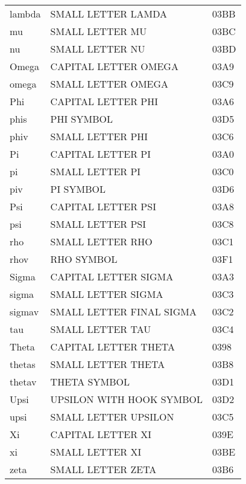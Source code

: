 \begin{longtable}{lll}
lambda             &  SMALL LETTER LAMDA            & 03BB\\
mu                 &  SMALL LETTER MU               & 03BC\\
nu                 &  SMALL LETTER NU               & 03BD\\
Omega              &  CAPITAL LETTER OMEGA          & 03A9\\
omega              &  SMALL LETTER OMEGA            & 03C9\\
Phi                &  CAPITAL LETTER PHI            & 03A6\\
phis               &  PHI SYMBOL                    & 03D5\\
phiv               &  SMALL LETTER PHI              & 03C6\\
Pi                 &  CAPITAL LETTER PI             & 03A0\\
pi                 &  SMALL LETTER PI               & 03C0\\
piv                &  PI SYMBOL                     & 03D6\\
Psi                &  CAPITAL LETTER PSI            & 03A8\\
psi                &  SMALL LETTER PSI              & 03C8\\
rho                &  SMALL LETTER RHO              & 03C1\\
rhov               &  RHO SYMBOL                    & 03F1\\
Sigma              &  CAPITAL LETTER SIGMA          & 03A3\\
sigma              &  SMALL LETTER SIGMA            & 03C3\\
sigmav             &  SMALL LETTER FINAL SIGMA      & 03C2\\
tau                &  SMALL LETTER TAU              & 03C4\\
Theta              &  CAPITAL LETTER THETA          & 0398\\
thetas             &  SMALL LETTER THETA            & 03B8\\
thetav             &  THETA SYMBOL                  & 03D1\\
Upsi               &  UPSILON WITH HOOK SYMBOL      & 03D2\\
upsi               &  SMALL LETTER UPSILON          & 03C5\\
Xi                 &  CAPITAL LETTER XI             & 039E\\
xi                 &  SMALL LETTER XI               & 03BE\\
zeta               &  SMALL LETTER ZETA             & 03B6\\
\end{longtable}




